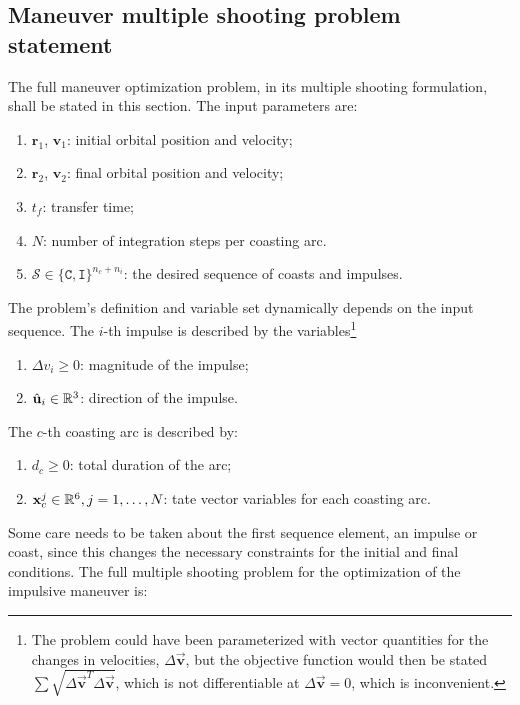 \subsection{Maneuver multiple shooting problem statement}\label{sec:impulsive_statement}

The full maneuver optimization problem, in its multiple shooting formulation, shall be stated in this section. The input parameters are:
\begin{enumerate}
    \item \(\mathbf{r}_1\), \(\mathbf{v}_1\): initial orbital position and velocity;
    \item \(\mathbf{r}_2\), \(\mathbf{v}_2\): final orbital position and velocity;
    \item \(t_f\): transfer time;
    \item \(N\): number of integration steps per coasting arc.
    \item \(\mathcal{S} \in \{\texttt{C}, \texttt{I}\}^{n_c + n_i}\): the desired sequence of coasts and impulses.
\end{enumerate}

The problem's definition and variable set dynamically depends on the input sequence. The \(i\)-th impulse is described by the variables\footnote{The problem could have been parameterized with vector quantities for the changes in velocities, \(\Delta \vec{\mathbf{v}}\), but the objective function would then be stated \(\sum \sqrt{\Delta \vec{\mathbf{v}}^T \Delta \vec{\mathbf{v}}}\), which is not differentiable at \(\Delta \vec {\mathbf{v}} = 0\), which is inconvenient.}
\begin{enumerate}
    \item \(\Delta v_i \geq 0\): magnitude of the impulse;
    \item \(\hat{\mathbf{u}}_i \in \mathbb{R}^3\): direction of the impulse.
\end{enumerate}

The \(c\)-th coasting arc is described by:
\begin{enumerate}
    \item \(d_c \geq 0\): total duration of the arc;
    \item \(\mathbf{x}^j_c \in \mathbb{R}^6, j=1,\dots,N\): tate vector variables for each coasting arc. 
\end{enumerate}

Some care needs to be taken about the first sequence element, an impulse or coast, since this changes the necessary constraints for the initial and final conditions. The full multiple shooting problem for the optimization of the impulsive maneuver is:

